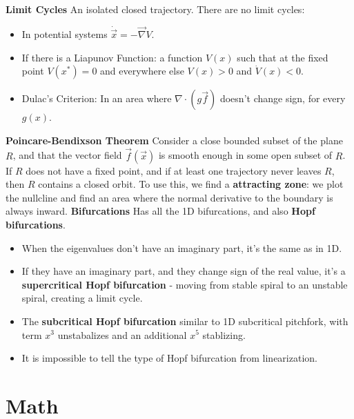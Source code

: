 \documentclass[twocolumn]{article}
\begin{document}
\textbf{Limit Cycles}
\newline
An isolated closed trajectory.
\newline
There are no limit cycles:
\begin{itemize}
    \item In potential systems $\dot{\vec{x}} = -\vec{\nabla}V$.
    \item If there is a Liapunov Function: a function $V(x)$ such that at the fixed point $V(x^*) = 0$ and everywhere else $V(x) > 0$ and $\dot{V}(x) < 0$.
    \item Dulac's Criterion: In an area where $\nabla \cdot (g\vec{f})$ doesn't change sign, for every $g(x)$.
\end{itemize}
\textbf{Poincare-Bendixson Theorem}
Consider a close bounded subset of the plane $R$, and that the vector field $\vec{f}(\vec{x})$ is smooth enough in some open subset of $R$. If $R$ does not have a fixed point, and if at least one trajectory never leaves $R$,
then $R$ contains a closed orbit.
\newline
To use this, we find a \textbf{attracting zone}: we plot the nullcline and find an area where the normal derivative to the boundary is always inward.
\newline
\textbf{Bifurcations}
Has all the 1D bifurcations, and also \textbf{Hopf bifurcations}.
\begin{itemize}
    \item When the eigenvalues don't have an imaginary part, it's the same as in 1D.
    \item If they have an imaginary part, and they change sign of the real value, it's a \textbf{supercritical Hopf bifurcation} - moving from stable spiral to an unstable spiral, creating a limit cycle.
    \item The \textbf{subcritical Hopf bifurcation} similar to 1D subcritical pitchfork, with term $x^3$ unstabalizes and an additional $x^5$ stablizing.
    \item It is impossible to tell the type of Hopf bifurcation from linearization.
\end{itemize}
\section{Math}
\end{document}
